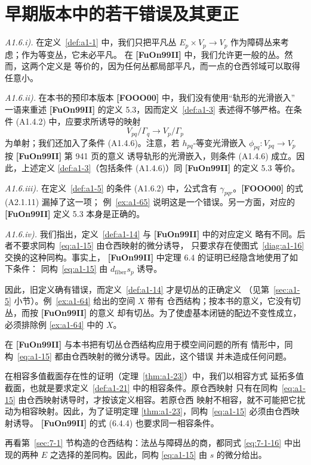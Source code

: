 
\section{早期版本中的若干错误及其更正}
\label{sec:a1-6}

\noindent\textit{A1.6.i).}
在定义~\ref{def:a1-1} 中，我们只把平凡丛
$E_p\times V_p\to V_p$ 作为障碍丛来考虑；作为等变丛，它未必平凡。
在 \textbf{[FuOn99II]} 中，我们允许更一般的丛。然而，这两个定义是
等价的，因为任何丛都局部平凡，而一点的仓西邻域可以取得任意小。

\medskip
\noindent\textit{A1.6.ii).}
在本书的预印本版本 \textbf{[FOOO00]} 中，我们没有使用“轨形的光滑嵌入”
一语来重述 \textbf{[FuOn99II]} 的定义 5.3，因而定义~\ref{def:a1-3}
表述得不够严格。在条件 (A1.4.2) 中，应要求所诱导的映射
\[
 V_{pq}/\Gamma_q\longrightarrow V_p/\Gamma_p
\]
为单射；我们还加入了条件 (A1.4.6)。注意，若
$h_{pq}$-等变光滑嵌入
$\phi_{pq}\colon V_{pq}\to V_p$ 按 \textbf{[FuOn99II]} 第 941 页的意义
诱导轨形的光滑嵌入，则条件 (A1.4.6) 成立。因此，上述定义
\ref{def:a1-3}（包括条件 (A1.4.6)）同 \textbf{[FuOn99II]} 的定义 5.3
等价。

\medskip
\noindent\textit{A1.6.iii).}
在定义~\ref{def:a1-5} 的条件 (A1.6.2) 中，公式含有
$\gamma_{pqr}$。\textbf{[FOOO00]} 的式 (A2.1.11) 漏掉了这一项；
例~\ref{ex:a1-65} 说明这是一个错误。另一方面，对应的
\textbf{[FuOn99II]} 定义 5.3 本身是正确的。

\medskip
\noindent\textit{A1.6.iv).}
我们指出，定义~\ref{def:a1-14} 与 \textbf{[FuOn99II]} 中的对应定义
略有不同。后者不要求同构~\eqref{eq:a1-15} 由仓西映射的微分诱导，
只要求存在使图式~\eqref{diag:a1-16} 交换的这种同构。事实上，
\textbf{[FuOn99II]} 中定理 6.4 的证明已经隐含地使用了如下条件：
同构~\eqref{eq:a1-15} 由 $d_{\mathrm{fiber}}s_p$ 诱导。

因此，旧定义确有错误，而定义~\ref{def:a1-14} 才是切丛的正确定义
（见第~\ref{sec:a1-5} 小节）。例~\ref{ex:a1-64} 给出的空间 $X$ 带有
仓西结构；按本书的意义，它没有切丛，而按 \textbf{[FuOn99II]} 的意义
却有切丛。为了使虚基本闭链的配边不变性成立，必须排除例
\ref{ex:a1-64} 中的 $X$。

在 \textbf{[FuOn99II]} 与本书把有切丛仓西结构应用于模空间问题的所有
情形中，同构~\eqref{eq:a1-15} 都由仓西映射的微分诱导。因此，这个错误
并未造成任何问题。

在相容多值截面存在性的证明（定理~\ref{thm:a1-23}）中，我们以相容方式
延拓多值截面，也就是要求定义~\ref{def:a1-21} 中的相容条件。原仓西映射
只有在同构~\eqref{eq:a1-15} 由仓西映射诱导时，才按该定义相容。若原仓西
映射不相容，就不可能把它扰动为相容映射。因此，为了证明定理
\ref{thm:a1-23}，同构~\eqref{eq:a1-15} 必须由仓西映射诱导。
\textbf{[FuOn99II]} 的式 (6.4.4) 也要求同一相容条件。

再看第~\ref{sec:7-1} 节构造的仓西结构：法丛与障碍丛的商，都同式
\eqref{eq:7-1-16} 中出现的两种 $E$ 之选择的差同构。因此，同构
\eqref{eq:a1-15} 由 $s$ 的微分给出。
